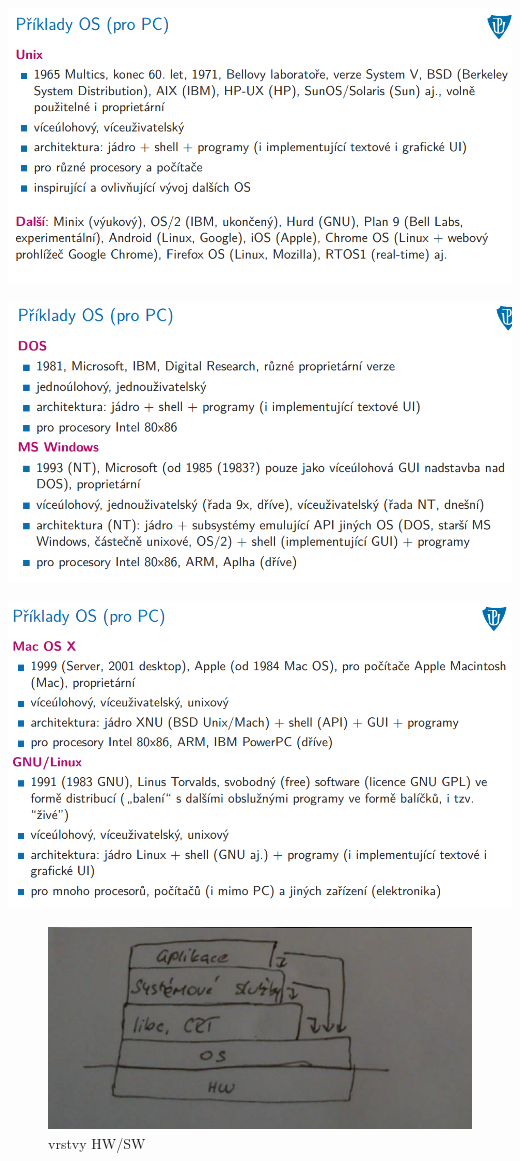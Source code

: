 \documentclass[10pt,a4paper]{article}
\begin{document}
\includegraphics[scale=0.65]{img/druhy_odstavec/os7.png}

\includegraphics[scale=0.65]{img/druhy_odstavec/os8.png}

\includegraphics[scale=0.65]{img/druhy_odstavec/os9.png}


\begin{figure} [h]
		\includegraphics[scale=1]{img/vrstvy_HW-SW.png}
		\caption{vrstvy HW/SW}	
\end{figure}
\end{document}
